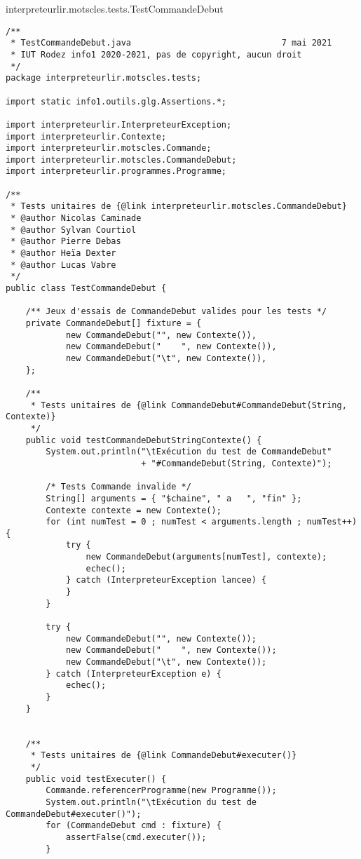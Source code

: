 \begin{enum}
    \item interpreteurlir.motscles.tests.TestCommandeDebut
\begin{verbatim}
/**
 * TestCommandeDebut.java                              7 mai 2021
 * IUT Rodez info1 2020-2021, pas de copyright, aucun droit
 */
package interpreteurlir.motscles.tests;

import static info1.outils.glg.Assertions.*;

import interpreteurlir.InterpreteurException;
import interpreteurlir.Contexte;
import interpreteurlir.motscles.Commande;
import interpreteurlir.motscles.CommandeDebut;
import interpreteurlir.programmes.Programme;

/**
 * Tests unitaires de {@link interpreteurlir.motscles.CommandeDebut}
 * @author Nicolas Caminade
 * @author Sylvan Courtiol
 * @author Pierre Debas
 * @author Heïa Dexter
 * @author Lucas Vabre
 */
public class TestCommandeDebut {
 
    /** Jeux d'essais de CommandeDebut valides pour les tests */
    private CommandeDebut[] fixture = { 
            new CommandeDebut("", new Contexte()),
            new CommandeDebut("    ", new Contexte()),
            new CommandeDebut("\t", new Contexte()),
    };
    
    /**
     * Tests unitaires de {@link CommandeDebut#CommandeDebut(String, Contexte)}
     */
    public void testCommandeDebutStringContexte() {
        System.out.println("\tExécution du test de CommandeDebut"
                           + "#CommandeDebut(String, Contexte)");
        
        /* Tests Commande invalide */
        String[] arguments = { "$chaine", " a   ", "fin" };
        Contexte contexte = new Contexte();
        for (int numTest = 0 ; numTest < arguments.length ; numTest++) {
            try {
                new CommandeDebut(arguments[numTest], contexte);
                echec();
            } catch (InterpreteurException lancee) { 
            }
        }
        
        try {
            new CommandeDebut("", new Contexte());
            new CommandeDebut("    ", new Contexte());
            new CommandeDebut("\t", new Contexte());
        } catch (InterpreteurException e) {
            echec();
        }
    }
    
    
    /**
     * Tests unitaires de {@link CommandeDebut#executer()}
     */
    public void testExecuter() {
        Commande.referencerProgramme(new Programme());
        System.out.println("\tExécution du test de CommandeDebut#executer()");
        for (CommandeDebut cmd : fixture) {
            assertFalse(cmd.executer());
        }
        

\end{verbatim}
\end{enum}

